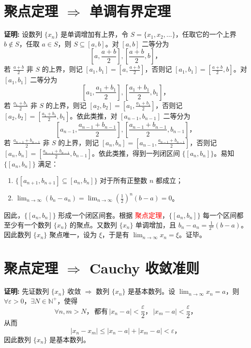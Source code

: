 \documentclass[lang=cn,newtx,10pt,scheme=chinese]{elegantbook}
\begin{document}
\section*{聚点定理 $\Rightarrow$ 单调有界定理}

\textbf{证明:} 设数列 $\{x_n\}$ 是单调增加有上界，令 $S = \{x_1, x_2, \ldots\}$，任取它的一个上界 $b \notin S$，任取 $a \in S$，则 $S \subseteq [a, b]$。对 $[a, b]$ 二等分为
\[
\left[ a, \frac{a + b}{2} \right], \left[ \frac{a + b}{2}, b \right]，
\]
若 $\frac{a + b}{2}$ 非 $S$ 的上界，则记 $[a_1, b_1] = \left[ a, \frac{a + b}{2} \right]$，否则记 $[a_1, b_1] = \left[ \frac{a + b}{2}, b \right]$。对 $[a_1, b_1]$ 二等分为
\[
\left[ a_1, \frac{a_1 + b_1}{2} \right], \left[ \frac{a_1 + b_1}{2}, b_1 \right]，
\]
若 $\frac{a_1 + b_1}{2}$ 非 $S$ 的上界，则记 $[a_2, b_2] = \left[ a_1, \frac{a_1 + b_1}{2} \right]$，否则记 $[a_2, b_2] = \left[ \frac{a_1 + b_1}{2}, b_1 \right]$。依此类推，对 $[a_{n-1}, b_{n-1}]$ 二等分为
\[
\left[ a_{n-1}, \frac{a_{n-1} + b_{n-1}}{2} \right], \left[ \frac{a_{n-1} + b_{n-1}}{2}, b_{n-1} \right]，
\]
若 $\frac{a_{n-1} + b_{n-1}}{2}$ 非 $S$ 的上界，则记 $[a_n, b_n] = \left[ a_{n-1}, \frac{a_{n-1} + b_{n-1}}{2} \right]$，否则记 $[a_n, b_n] = \left[ \frac{a_{n-1} + b_{n-1}}{2}, b_{n-1} \right]$。依此类推，得到一列闭区间 $\{[a_n, b_n]\}$。易知 $\{[a_n, b_n]\}$ 满足：
\begin{enumerate}
    \item $\{[a_{n+1}, b_{n+1}] \subseteq [a_n, b_n]\}$ 对于所有正整数 $n$ 都成立；
    \item $\lim_{n \to \infty} (b_n - a_n) = \lim_{n \to \infty} \left(\frac{1}{2}\right)^n (b - a) = 0$。
\end{enumerate}

因此，$\{[a_n, b_n]\}$ 形成一个闭区间套。根据 \textcolor{red}{聚点定理}，$\{[a_n, b_n]\}$ 每一个区间都至少有一个数列 $\{x_n\}$ 的聚点。又数列 $\{x_n\}$ 单调增加，且 $b_n - a_n = \frac{1}{2^n} (b - a)$。因此数列 $\{x_n\}$ 聚点唯一，设为 $\xi$，于是有 $\lim_{n \to \infty} x_n = \xi$。证毕。

\section*{聚点定理 $\Rightarrow$ Cauchy 收敛准则}

\textbf{证明:} 先证数列 $\{x_n\}$ 收敛 $\Rightarrow$ 数列 $\{x_n\}$ 是基本数列。设 $\lim_{n \to \infty} x_n = a$，则 $\forall \varepsilon > 0$，$\exists N \in \mathbb{N}^+$，使得
\[
\forall n, m > N，\, 都有 \, |x_n - a| < \frac{\varepsilon}{2}，\, |x_m - a| < \frac{\varepsilon}{2}，
\]
从而
\[
|x_n - x_m| \leq |x_n - a| + |x_m - a| < \varepsilon，
\]
因此数列 $\{x_n\}$ 是基本数列。
\end{document}
